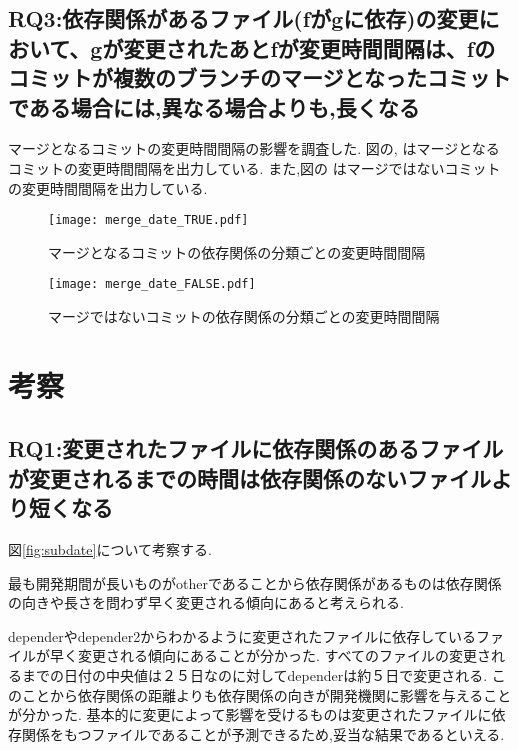 \documentclass{fose2016}           %
\begin{document}
\subsection{RQ3:依存関係があるファイル(fがgに依存)の変更において、gが変更されたあとfが変更時間間隔は、fのコミットが複数のブランチのマージとなったコミットである場合には,異なる場合よりも,長くなる}
マージとなるコミットの変更時間間隔の影響を調査した.
図の,\label{fig:merge_true_subdate} はマージとなるコミットの変更時間間隔を出力している.
また,図の\label{fig:merge_false_subdate} はマージではないコミットの変更時間間隔を出力している.

\begin{figure}
\centering
\begin{minipage}{0.49\columnwidth}
\centering
\texttt{[image: merge\_date\_TRUE.pdf]}
\caption{マージとなるコミットの依存関係の分類ごとの変更時間間隔}
\label{fig:merge_true_subdate} 
\end{minipage}
\begin{minipage}{0.49\columnwidth}
\centering
\texttt{[image: merge\_date\_FALSE.pdf]}
\caption{マージではないコミットの依存関係の分類ごとの変更時間間隔}
\label{fig:merge_false_subdate}
\end{minipage}
\end{figure}


\section{考察}\label{考察}

\subsection{RQ1:変更されたファイルに依存関係のあるファイルが変更されるまでの時間は依存関係のないファイルより短くなる}
図\ref{fig:subdate}について考察する.

最も開発期間が長いものがotherであることから依存関係があるものは依存関係の向きや長さを問わず早く変更される傾向にあると考えられる.


dependerやdepender2からわかるように変更されたファイルに依存しているファイルが早く変更される傾向にあることが分かった.
すべてのファイルの変更されるまでの日付の中央値は２５日なのに対してdependerは約５日で変更される.
このことから依存関係の距離よりも依存関係の向きが開発機関に影響を与えることが分かった.
基本的に変更によって影響を受けるものは変更されたファイルに依存関係をもつファイルであることが予測できるため,妥当な結果であるといえる.
\end{document}
